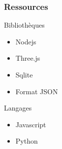 \documentclass[11pt]{beamer}
\begin{document}
\begin{frame}
\frametitle{Ressources}
\begin{block}{Bibliothèques}
	\begin{itemize}
		\item Nodejs
		\item Three.js
		\item Sqlite 
		\item Format JSON
	\end{itemize}
\end{block}

\begin{block}{Langages}
	\begin{itemize}
		\item Javascript
		\item Python
	\end{itemize}
\end{block}
\end{frame}
\end{document}
